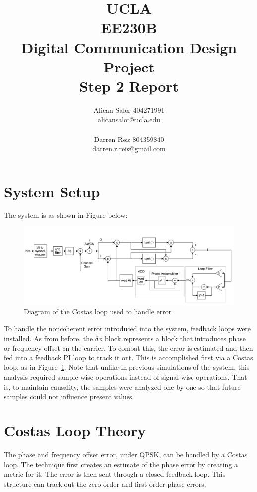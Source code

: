 \documentclass[]{article}
\title{UCLA\\EE230B\\Digital Communication Design Project\\Step 2 Report}
\author{Alican Salor 404271991 \\  \href{mailto:alicansalor@ucla.edu}{alicansalor@ucla.edu} \\ \\
Darren Reis 804359840 \\
\href{mailto:darrer.r.reis@gmail.com}{darren.r.reis@gmail.com} }
\begin{document}
\maketitle

\newpage
\tableofcontents

\newpage


\section{System Setup}
\label{sec:setup}
The system is as shown in Figure below:

\begin{figure}[H]
\centering
\includegraphics[width=\textwidth]{costas.png}
\caption{Diagram of the Costas loop used to handle error\label{fig:costas}}
\end{figure}

To handle the noncoherent error introduced into the system, feedback loops were installed.  As from before, the $\delta\phi$ block represents a block that introduces phase or frequency offset on the carrier.  To combat this, the error is estimated and then fed into a feedback PI loop to track it out.  This is accomplished first via a Costas loop, as in Figure~\ref{fig:costas}.  Note that unlike in previous simulations of the system, this analysis required sample-wise operations instead of signal-wise operations.  That is, to maintain causality, the samples were analyzed one by one so that future samples could not influence present values.
\section{Costas Loop Theory}
\label{sec:costas}
The phase and frequency offset error, under QPSK, can be handled by a Costas loop.  The technique first creates an estimate of the phase error by creating a metric for it.  The error is then sent through a closed feedback loop.  This structure can track out the zero order and first order phase errors. 
\end{document}
